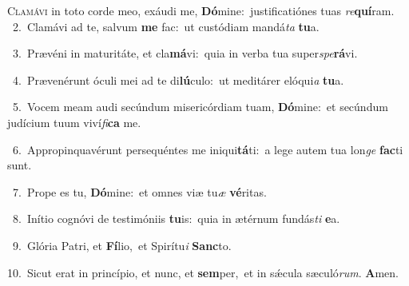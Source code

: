 \lettrine{\initial\textcolor{\initialcolor}{C}}{lamávi} in toto corde meo, exáudi me, \textbf{Dó}\-mine:~\star justificatiónes tuas \textit{re}\-\textbf{quí}ram.\\
{\numbfont\textcolor{\numbcolor}{~2.}}~Clamávi ad te, salvum \textbf{me} fac:~\star ut custódiam mandá\textit{ta} \textbf{tu}\-a.\par
{\numbfont\textcolor{\numbcolor}{~3.}}~Prævéni in maturitáte, et cla\-\textbf{má}\-vi:~\star quia in verba tua super\-\textit{spe}\-\textbf{rá}vi.\par
{\numbfont\textcolor{\numbcolor}{~4.}}~Prævenérunt óculi mei ad te di\-\textbf{lú}\-culo:~\star ut meditárer elóqui\textit{a} \textbf{tu}\-a.\par
{\numbfont\textcolor{\numbcolor}{~5.}}~Vocem meam audi secúndum misericórdiam tuam, \textbf{Dó}\-mine:~\star et secúndum judícium tuum viví\-\textit{fi}\-\textbf{ca} me.\par
{\numbfont\textcolor{\numbcolor}{~6.}}~Appropinquavérunt persequéntes me iniqui\-\textbf{tá}\-ti:~\star a lege autem tua lon\textit{ge} \textbf{fac}\-ti sunt.\par
{\numbfont\textcolor{\numbcolor}{~7.}}~Prope es tu, \textbf{Dó}\-mine:~\star et omnes viæ tu\textit{æ} \textbf{vé}\-ritas.\par
{\numbfont\textcolor{\numbcolor}{~8.}}~Inítio cognóvi de testimóniis \textbf{tu}\-is:~\star quia in ætérnum fundás\textit{ti} \textbf{e}\-a.\par
{\numbfont\textcolor{\numbcolor}{~9.}}~Glória Patri, et \textbf{Fí}\-lio,~\star et Spirítu\textit{i} \textbf{Sanc}\-to.\par
{\numbfont\textcolor{\numbcolor}{10.}}~Sicut erat in princípio, et nunc, et \textbf{sem}\-per,~\star et in sǽcula sæculó\-\textit{rum}\-. \textbf{A}\-men.\par
